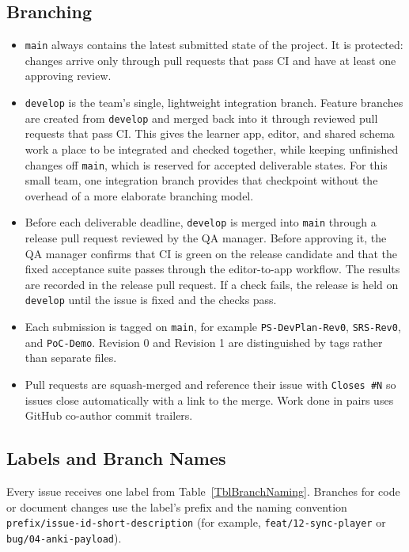 \documentclass{article}
\begin{document}
\subsection{Branching}
\begin{itemize}
    \item \texttt{main} always contains the latest submitted state of the
    project. It is protected: changes arrive only through pull requests that
    pass CI and have at least one approving review.
    \item \texttt{develop} is the team's single, lightweight integration
    branch. Feature branches are created from \texttt{develop} and merged back
    into it through reviewed pull requests that pass CI. This gives the learner
    app, editor, and shared schema work a place to be integrated and checked
    together, while keeping unfinished changes off \texttt{main}, which is
    reserved for accepted deliverable states. For this small team, one
    integration branch provides that checkpoint without the overhead of a more
    elaborate branching model.
    \item Before each deliverable deadline, \texttt{develop} is merged into
    \texttt{main} through a release pull request reviewed by the QA manager.
    Before approving it, the QA manager confirms that CI is green on the
    release candidate and that the fixed acceptance suite passes through the
    editor-to-app workflow. The results are recorded in the release pull
    request. If a check fails, the release is held on \texttt{develop} until
    the issue is fixed and the checks pass.
    \item Each submission is tagged on \texttt{main}, for example
    \texttt{PS-DevPlan-Rev0}, \texttt{SRS-Rev0}, and \texttt{PoC-Demo}. Revision 0
    and Revision 1 are distinguished by tags rather than separate files.
    \item Pull requests are squash-merged and reference their issue with
    \texttt{Closes \#N} so issues close automatically with a link to the merge.
    Work done in pairs uses GitHub co-author commit trailers.
\end{itemize}

\subsection{Labels and Branch Names}
Every issue receives one label from Table~\ref{TblBranchNaming}. Branches for
code or document changes use the label's prefix and the naming convention
\texttt{prefix/issue-id-short-description} (for example,
\texttt{feat/12-sync-player} or \texttt{bug/04-anki-payload}).
\end{document}
